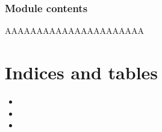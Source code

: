 \documentclass[letterpaper,10pt,english]{sphinxmanual}
\begin{document}
\subsection{Module contents}
\label{\detokenize{doppler_dimming_lib:module-doppler_dimming_lib}}\label{\detokenize{doppler_dimming_lib:module-contents}}
\sphinxAtStartPar
AAAAAAAAAAAAAAAAAAAAAA


\chapter{Indices and tables}
\label{\detokenize{index:indices-and-tables}}\begin{itemize}
\item {} 
\sphinxAtStartPar
{}

\item {} 
\sphinxAtStartPar
{}

\item {} 
\sphinxAtStartPar
{}

\end{itemize}
\end{document}
